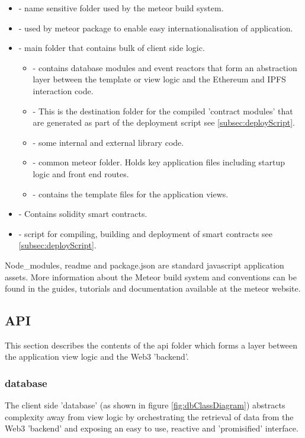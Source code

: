 \begin{itemize}
\item {} - name sensitive folder used by the meteor build system.
\item {} - used by meteor package to enable easy internationalisation of application.
\item {} - main folder that contains bulk of client side logic. 
\begin{itemize}
\item {} - contains database modules and event reactors that form an abstraction layer between the template or view logic and the Ethereum and IPFS interaction code.
\item {} - This is the destination folder for the compiled 'contract modules' that are generated as part of the deployment script see \ref{subsec:deployScript}.
\item {} - some internal and external library code.
\item {} - common meteor folder. Holds key application files including startup logic and front end routes.
\item {} - contains the template files for the application views.  
\end{itemize}
\item {} - Contains solidity smart contracts.
\item {} - script for compiling, building and deployment of smart contracts see \ref{subsec:deployScript}.
\end{itemize}

Node\_modules, readme and package.json are standard javascript application assets. More information about the Meteor build system and conventions can be found in the guides, tutorials and documentation available at the meteor website.\\

\subsection{API}
This section describes the contents of the api folder which forms a layer between the application view logic and the Web3 'backend'.

\subsubsection{database}
The client side 'database' (as shown in figure \ref{fig:dbClassDiagram}) abstracts complexity away from view logic by orchestrating the retrieval of data from the Web3 'backend' and exposing an easy to use, reactive and 'promisified' interface.\\

